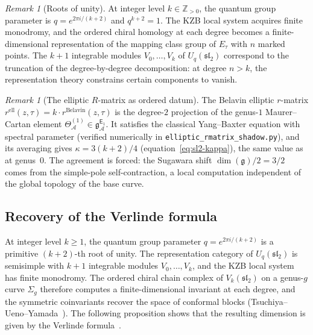 \documentclass[11pt,reqno]{amsart}
\theoremstyle{definition}
\theoremstyle{remark}
\newtheorem{remark}[theorem]{Remark}
\newcommand{\cA}{\mathcal{A}}
\newcommand{\Eone}{\mathsf{E}_{1}}
\newcommand{\fg}{\mathfrak{g}}
\newcommand{\gEone}{\mathfrak{g}^{\Eone}_{\cA}}
\newcommand{\ZZ}{\mathbb{Z}}
\numberwithin{equation}{section}
\begin{document}
\begin{remark}[Roots of unity]
\label{rem:ell-roots-of-unity}
At integer level $k \in \ZZ_{>0}$, the quantum group
parameter is $q = e^{2\pi i/(k+2)}$ and
$q^{k+2} = 1$. The KZB local system acquires finite
monodromy, and the ordered chiral homology at each degree
becomes a finite-dimensional representation of the mapping
class group of $E_\tau$ with $n$ marked points. The
$k + 1$ integrable modules $V_0, \ldots, V_k$ of
$U_q(\mathfrak{sl}_2)$ correspond to the truncation of the
degree-by-degree decomposition: at degree $n > k$, the
representation theory constrains certain components to
vanish.
\end{remark}

\begin{remark}[The elliptic $R$-matrix as ordered datum]
\label{rem:ell-r-matrix-ordered}
The Belavin elliptic $r$-matrix
$r^{\mathrm{ell}}(z, \tau) = k \cdot r^{\mathrm{Belavin}}
(z, \tau)$ is the degree-$2$ projection of the genus-$1$
Maurer--Cartan element
$\Theta_\cA^{(1)} \in \gEone$. It satisfies the classical
Yang--Baxter equation with spectral parameter (verified
numerically in \texttt{elliptic\_rmatrix\_shadow.py}),
and its averaging gives $\kappa = 3(k+2)/4$
(equation~\eqref{eq:sl2-kappa}), the same value as at
genus~$0$. The agreement is forced: the Sugawara shift
$\dim(\fg)/2 = 3/2$ comes from the simple-pole
self-contraction, a local computation independent of the
global topology of the base curve.
\end{remark}


\subsection{Recovery of the Verlinde formula}
\label{subsec:verlinde-recovery}

At integer level $k \geq 1$, the quantum group parameter
$q = e^{2\pi i/(k+2)}$ is a primitive $(k+2)$-th root of unity.
The representation category of $U_q(\mathfrak{sl}_2)$ is
semisimple with $k+1$ integrable modules $V_0, \ldots, V_k$,
and the KZB local system has finite monodromy.
The ordered chiral chain complex of $V_k(\mathfrak{sl}_2)$
on a genus-$g$ curve $\Sigma_g$ therefore computes
a finite-dimensional invariant at each degree, and the
symmetric coinvariants recover the space of conformal
blocks (Tsuchiya--Ueno--Yamada~\cite{TUY89}).
The following proposition shows that the resulting dimension
is given by the Verlinde formula~\cite{Verlinde88}.
\end{document}
